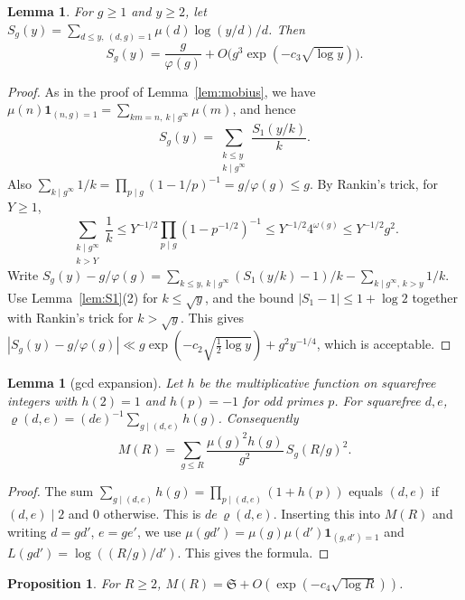 \documentclass[11pt]{amsart}
\newtheorem{proposition}[theorem]{Proposition}
\newtheorem{lemma}[theorem]{Lemma}
\theoremstyle{definition}
\theoremstyle{remark}
\numberwithin{equation}{section}
\begin{document}
\begin{lemma}\label{lem:Sg}
For $g\ge1$ and $y\ge2$, let
$S_g(y)=\sum_{d\le y,\ (d,g)=1}\mu(d)\log(y/d)/d$.  Then
\[
 S_g(y)=\frac g{\varphi(g)}+O\bigl(g^3\exp(-c_3\sqrt{\log y})\bigr).
\]
\end{lemma}

\begin{proof}
As in the proof of Lemma~\ref{lem:mobius}, we have
$\mu(n)\mathbf 1_{(n,g)=1}=\sum_{km=n,\ k\mid g^\infty}\mu(m)$, and hence
\[
 S_g(y)=\sum_{\substack{k\le y\\ k\mid g^\infty}}\frac{S_1(y/k)}k .
\]
Also $\sum_{k\mid g^\infty}1/k=\prod_{p\mid g}(1-1/p)^{-1}=g/\varphi(g)\le g$.
By Rankin's trick, for $Y\ge1$,
\[
 \sum_{\substack{k\mid g^\infty\\ k>Y}}\frac1k\le
 Y^{-1/2}\prod_{p\mid g}(1-p^{-1/2})^{-1}\le Y^{-1/2}4^{\omega(g)}\le
 Y^{-1/2}g^2 .
\]
Write
$S_g(y)-g/\varphi(g)=\sum_{k\le y,\,k\mid g^\infty}(S_1(y/k)-1)/k
-\sum_{k\mid g^\infty,\,k>y}1/k$.  Use Lemma~\ref{lem:S1}(2) for
$k\le\sqrt y$, and the bound $|S_1-1|\le1+\log2$ together with Rankin's
trick for $k>\sqrt y$.  This gives
$|S_g(y)-g/\varphi(g)|\ll g\exp(-c_2\sqrt{\tfrac12\log y})+g^2y^{-1/4}$,
which is acceptable.
\end{proof}

\begin{lemma}[gcd expansion]\label{lem:gcd}
Let $h$ be the multiplicative function on squarefree integers with
$h(2)=1$ and $h(p)=-1$ for odd primes $p$.  For squarefree $d,e$,
$\varrho(d,e)=(de)^{-1}\sum_{g\mid(d,e)}h(g)$.  Consequently
\[
 M(R)=\sum_{g\le R}\frac{\mu(g)^2h(g)}{g^2}\,S_g(R/g)^2 .
\]
\end{lemma}

\begin{proof}
The sum $\sum_{g\mid(d,e)}h(g)=\prod_{p\mid(d,e)}(1+h(p))$ equals
$(d,e)$ if $(d,e)\mid2$ and $0$ otherwise.  This is $de\,\varrho(d,e)$.
Inserting this into $M(R)$ and writing $d=gd'$, $e=ge'$, we use
$\mu(gd')=\mu(g)\mu(d')\mathbf 1_{(g,d')=1}$ and
$L(gd')=\log((R/g)/d')$.  This gives the formula.
\end{proof}

\begin{proposition}\label{prop:mainterm}
For $R\ge2$, $M(R)=\mathfrak S+O(\exp(-c_4\sqrt{\log R}))$.
\end{proposition}
\end{document}
